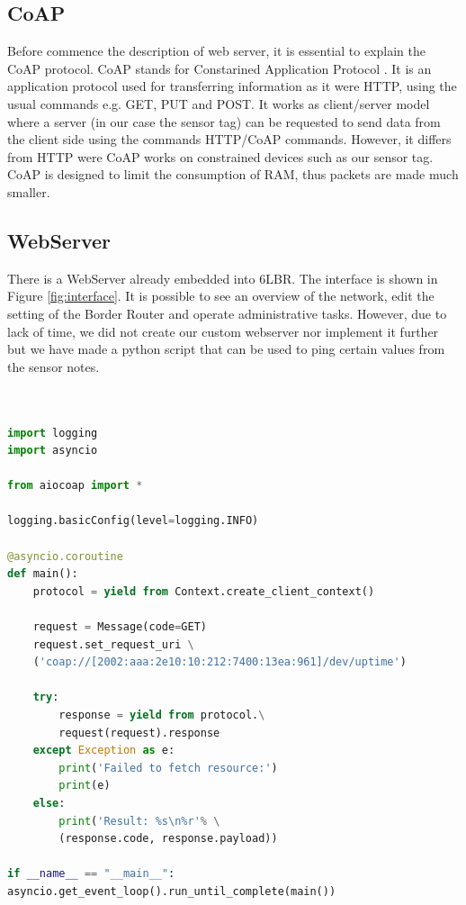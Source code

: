 \subsection{CoAP}
Before commence the description of web server, it is essential to explain the CoAP protocol. CoAP stands for Constarined Application Protocol \cite{coap}. It is an application protocol used for transferring information as it were HTTP, using the usual commands e.g. GET, PUT and POST. It works as client/server model where a server (in our case the sensor tag) can be requested to send data from the client side using the commands HTTP/CoAP commands. However, it differs from HTTP were CoAP works on constrained devices such as our sensor tag. CoAP is designed to limit the consumption of RAM, thus packets are made much smaller.

\subsection{WebServer}
There is a WebServer already embedded into 6LBR. The interface is shown in Figure \ref{fig:interface}. It is possible to see an overview of the network, edit the setting of the Border Router and operate administrative tasks. However, due to lack of time, we did not create our custom webserver nor implement it further but we have made a python script that can be used to ping certain values from the sensor notes.

\begin{lstlisting}[basicstyle=\tiny,language=python,caption={Python code built on a open source CoAP library \cite{coapCode}. got to read CoAP messages that could also be used to output data onto a more user friendly web page}]


import logging
import asyncio

from aiocoap import *

logging.basicConfig(level=logging.INFO)

@asyncio.coroutine
def main():
	protocol = yield from Context.create_client_context()

	request = Message(code=GET)
	request.set_request_uri \
	('coap://[2002:aaa:2e10:10:212:7400:13ea:961]/dev/uptime')

	try:
		response = yield from protocol.\
		request(request).response
	except Exception as e:
		print('Failed to fetch resource:')
		print(e)
	else:
		print('Result: %s\n%r'% \
		(response.code, response.payload))

if __name__ == "__main__":
asyncio.get_event_loop().run_until_complete(main())

\end{lstlisting}




